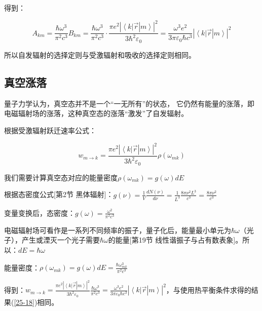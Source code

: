 得到：

\begin{equation}\label{25-18}
A_{km}  = \frac{{\hbar \omega ^3 }}{{\pi ^2 c^3 }}B_{km}  =
\frac{{\hbar \omega ^3 }}{{\pi ^2 c^3 }} \cdot \frac{{\pi e^2 |
\left\langle k \right|\left. {\vec r} \right|\left. m \right\rangle
|^2 }}{{3\hbar ^2 \varepsilon _0 }} = \frac{{\omega ^3 e^2 }}{{3\pi
\varepsilon _0 \hbar c^3 }} | \left\langle k \right|\left. {\vec r}
\right|\left. m \right\rangle |^2
\end{equation}

所以自发辐射的选择定则与受激辐射和吸收的选择定则相同。


\subsection{真空涨落}

量子力学认为，真空态并不是一个``一无所有''的状态，
它仍然有能量的涨落，即电磁辐射场的涨落，这种真空态的涨落``激发''了自发辐射。


根据受激辐射跃迁速率公式：

\begin{equation}\label{25-19}
w_{m \to k}  = \frac{{\pi e^2 | \left\langle k \right|\left. {\vec
r} \right|\left. m \right\rangle |^2 }}{{3\hbar ^2 \varepsilon _0
}}\rho (\omega _{mk} )
\end{equation}

我们需要计算真空态对应的能量密度$\rho (\omega _{mk} ) = g(\omega )dE$

根据态密度公式[第2节 黑体辐射]：$g(\nu ) = \frac{1}{V}\frac{{dN(\nu )}}{{d\nu }} = \frac{1}{{L^3 }}\frac{{8\pi \nu ^2 L^3 }}{{c^3 }} = \frac{{8\pi \nu ^2 }}{{c^3 }}$

变量变换后，态密度：$g(\omega ) = \frac{{\omega ^2 }}{{\pi ^2 c^3 }}$

电磁辐射场可看作是一系列不同频率的振子，量子化后，能量最小单元为$\hbar \omega $（光子），产生或湮灭一个光子需要$\hbar \omega $的能量[第19节 线性谐振子与占有数表象]。所以：$dE = \hbar \omega $

能量密度：$\rho (\omega _{mk} ) = g(\omega )dE = \frac{{\hbar \omega _{mk} ^3 }}{{\pi ^2 c^3 }}$

得到：$w_{m \to k}  = \frac{{\pi e^2 | \left\langle k \right|\left.
{\vec r} \right|\left. m \right\rangle |^2 }}{{3\hbar ^2 \varepsilon
_0 }}\frac{{\hbar \omega ^3 }}{{\pi ^2 c^3 }} = \frac{{\omega ^3 e^2
}}{{3\pi \varepsilon _0 \hbar c^3 }} | \left\langle k \right|\left.
{\vec r} \right|\left. m \right\rangle |^2
$，与使用热平衡条件求得的结果(\ref{25-18})相同。




